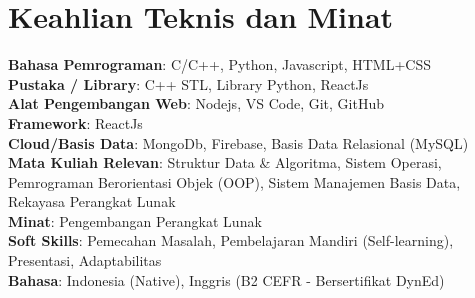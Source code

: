 \documentclass[a4paper,11pt]{article}
\begin{document}
\section{\textbf{Keahlian Teknis dan Minat}}
\begin{itemize}[leftmargin=0.05in, label={}]
  \small{\item{
        \textbf{Bahasa Pemrograman}{: C/C++, Python, Javascript, HTML+CSS } \\
        \textbf{Pustaka / Library}{: C++ STL, Library Python, ReactJs }\\
        \textbf{Alat Pengembangan Web}{: Nodejs, VS Code, Git, GitHub } \\
        \textbf{Framework}{: ReactJs } \\
        \textbf{Cloud/Basis Data}{: MongoDb, Firebase, Basis Data Relasional (MySQL) } \\

        \textbf{Mata Kuliah Relevan}{: Struktur Data \& Algoritma, Sistem Operasi, Pemrograman Berorientasi Objek (OOP), Sistem Manajemen Basis Data, Rekayasa Perangkat Lunak } \\
        \textbf{Minat}{: Pengembangan Perangkat Lunak} \\
        \textbf{Soft Skills}{: Pemecahan Masalah, Pembelajaran Mandiri (Self-learning), Presentasi, Adaptabilitas} \\
        \textbf{Bahasa}{: Indonesia (Native), Inggris (B2 CEFR - Bersertifikat DynEd)} \\
        }}
\end{itemize}
\vspace{-16pt}
\end{document}

